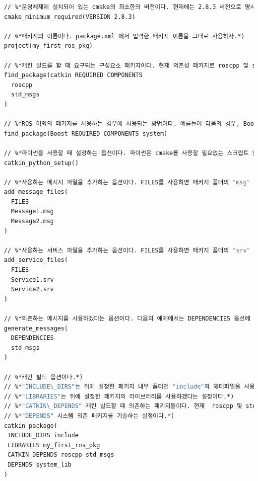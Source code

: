 \begin{lstlisting}[language=make,backgroundcolor=\color{white}]
// %*운영체제에 설치되어 있는 cmake의 최소한의 버전이다. 현재에는 2.8.3 버전으로 명시되어 있다. 이 보다 낮은 cmake를 사용하는 경우에는 버전 업데이트를 해줘야 한다.*)
cmake_minimum_required(VERSION 2.8.3)

// %*패키지의 이름이다. package.xml 에서 입력한 패키지 이름을 그대로 사용하자.*)
project(my_first_ros_pkg)

// %*캐킨 빌드를 할 때 요구되는 구성요소 패키지이다. 현재 의존성 패키지로 roscpp 및 std\_msgs가 추가되어 있다. 여기에 입력된 패키지가 없는 경우 캐킨 빌드할 때 사용자에게 에러가 표시된다. 즉, 사용자가 만든 패키지가 의존하는 패키지를 먼저 설치하게 만드는 옵션이다.*)
find_package(catkin REQUIRED COMPONENTS
  roscpp
  std_msgs
)

// %*ROS 이외의 패키지를 사용하는 경우에 사용되는 방법이다. 예를들어 다음의 경우, Boost를 사용할때 system 이라는 패키지가 설되어 있어야 한다. 기능은 위에서 설명한 의존하는 패키지를 먼저 설치하게 만드는 옵션이다.*)
find_package(Boost REQUIRED COMPONENTS system)

// %*파이썬을 사용할 때 설정하는 옵션이다. 파이썬은 cmake를 사용할 필요없는 스크립트 언어이지만 패키지의 호환성을 위해 아래와 같이 독자적인 설정을 하게 되어 있다.*)
catkin_python_setup()

// %*사용하는 메시지 파일을 추가하는 옵션이다. FILES를 사용하면 패키지 폴더의 "msg" 안의 .msg 파일들을 참조하게 된다. 다음의 예제에서는 Message1.msg 및 Message2.msg 의 메시지 파일을 이용하겠다는 옵션이다.*)
add_message_files(
  FILES
  Message1.msg
  Message2.msg
)

// %*사용하는 서비스 파일을 추가하는 옵션이다. FILES를 사용하면 패키지 폴더의 "srv" 안의 .srv 파일들을 참조하게 된다. 다음의 예제에서는 Service1.srv 및 Service2.srv 의 서비스 파일을 이용하겠다는 옵션이다.*)
add_service_files(
  FILES
  Service1.srv
  Service2.srv
)

// %*의존하는 메시지를 사용하겠다는 옵션이다. 다음의 예제에서는 DEPENDENCIES 옵션에 의하여 std\_msgs 라는 메시지 패키지를 사용하겠다는 설정이다.*)
generate_messages(
  DEPENDENCIES
  std_msgs
)

// %*캐킨 빌드 옵션이다.*)
// %*"INCLUDE\_DIRS"는 뒤에 설정한 패키지 내부 폴더인 "include"의 헤더파일을 사용하겠다는 설정이다.*)
// %*"LIBRARIES"는 뒤에 설정한 패키지의 라이브러리를 사용하겠다는 설정이다.*)
// %*"CATKIN\_DEPENDS" 캐킨 빌드할 때 의존하는 패키지들이다. 현재  roscpp 및 std\_msgs가 의존하고 있다는 설정이다.*)
// %*"DEPENDS" 시스템 의존 패키지를 기술하는 설정이다.*)
catkin_package(
 INCLUDE_DIRS include
 LIBRARIES my_first_ros_pkg
 CATKIN_DEPENDS roscpp std_msgs
 DEPENDS system_lib
)


\end{lstlisting}
